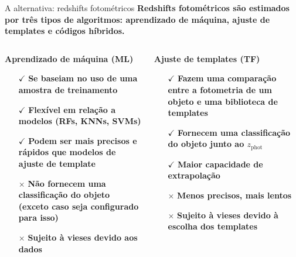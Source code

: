 \begin{frame}[c]{A alternativa: redshifts fotométricos}
    \textbf{Redshifts fotométricos são estimados por três tipos de algoritmos: aprendizado de máquina, ajuste de templates e códigos híbridos.}

    \begin{columns}[c]
        \footnotesize
        \begin{column}{0.46\textwidth}
            \begin{splusbox}{\textbf{Aprendizado de máquina (ML)}}
                \begin{itemize}
                    \justifying
                    \item[$\checkmark$] \textbf{Se baseiam no uso de uma amostra de treinamento}
                    \item[$\checkmark$] \textbf{Flexível em relação a modelos (RFs, KNNs, SVMs)}
                    \item[$\checkmark$] \textbf{Podem ser mais precisos e rápidos que modelos de ajuste de template}
                    \item[$\times$] \textbf{Não fornecem uma classificação do objeto (exceto caso seja configurado para isso)}
                    \item[$\times$] \textbf{Sujeito à vieses devido aos dados}
                \end{itemize}
            \end{splusbox}
        \end{column}

        \begin{column}{0.46\textwidth}
            \begin{splusbox}{\textbf{Ajuste de templates (TF)}}
                \begin{itemize}
                    \justifying
                    \item[$\checkmark$] \textbf{Fazem uma comparação entre a fotometria de um objeto e uma biblioteca de templates}
                    \item[$\checkmark$] \textbf{Fornecem uma classificação do objeto junto ao $z_\text{phot}$}
                    \item[$\checkmark$] \textbf{Maior capacidade de extrapolação}
                    \item[$\times$] \textbf{Menos precisos, mais lentos}
                    \item[$\times$] \textbf{Sujeito à vieses devido à escolha dos templates}
                \end{itemize}
            \end{splusbox}
        \end{column}


\end{columns}
\end{frame}
